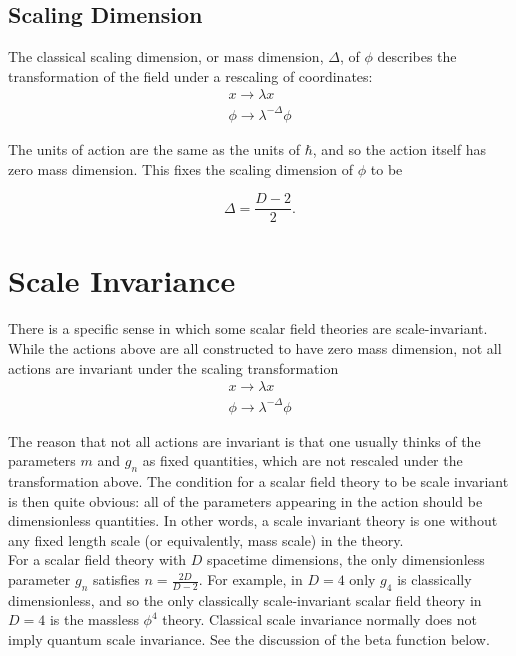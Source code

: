 \subsection{Scaling Dimension}

The classical scaling dimension, or mass dimension, $\Delta$, of $\phi$ describes the transformation of the field under a rescaling of coordinates:\\

\begin{align}
    x\rightarrow\lambda x \\
    \phi\rightarrow\lambda^{-\Delta}\phi
\end{align}

The units of action are the same as the units of $\hbar$, and so the action itself has zero mass dimension. This fixes the scaling dimension of $\phi$ to be

\begin{equation}
    \Delta =\frac{D-2}{2}.
\end{equation}

\section{Scale Invariance}

There is a specific sense in which some scalar field theories are scale-invariant. While the actions above are all constructed to have zero mass dimension, not all actions are invariant under the scaling transformation\\

\begin{align}
    x\rightarrow\lambda x \\
    \phi\rightarrow\lambda^{-\Delta}\phi
\end{align}

The reason that not all actions are invariant is that one usually thinks of the parameters $m$ and $g_n$ as fixed quantities, which are not rescaled under the transformation above. The condition for a scalar field theory to be scale invariant is then quite obvious: all of the parameters appearing in the action should be dimensionless quantities. In other words, a scale invariant theory is one without any fixed length scale (or equivalently, mass scale) in the theory.\\

For a scalar field theory with $D$ spacetime dimensions, the only dimensionless parameter $g_n$ satisfies $n=\frac{2D}{D-2}$. For example, in $D=4$ only $g_4$ is classically dimensionless, and so the only classically scale-invariant scalar field theory in $D=4$ is the massless $\phi^4$ theory. Classical scale invariance normally does not imply quantum scale invariance. See the discussion of the beta function below.

